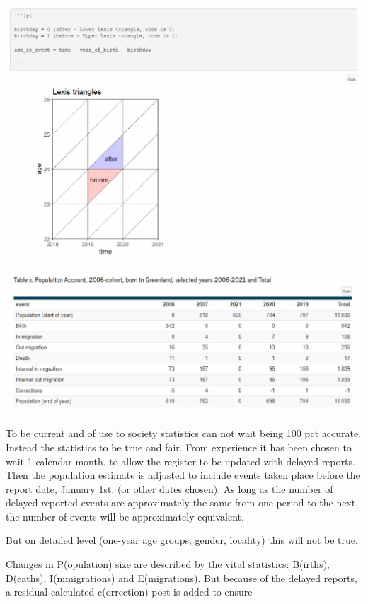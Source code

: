 \documentclass[USenglish]{article}
\begin{document}
\includegraphics[scale=0.25]{images/PopulationAccountLexis}



\includegraphics[scale=0.22]{images/PopulationAccountTabX}


To be current and of use to society statistics can not wait being 100 pct accurate. Instead the statistics to be true and fair. From experience it has been chosen to wait 1 calendar month, to allow the register to be updated with delayed reports. Then the population estimate is adjusted to include events taken place before the report date, January 1st. (or other dates chosen). As long as the number of delayed reported events are approximately the same from one period to the next, the number of events will be approximately equivalent.

But on detailed level (one-year age groups, gender, locality) this will not be true.

Changes in P(opulation) size are described by the vital statistics: B(irths), D(eaths), I(mmigrations) and E(migrations). But because of the delayed reports, a residual calculated c(orrection) post is added to ensure
\end{document}
